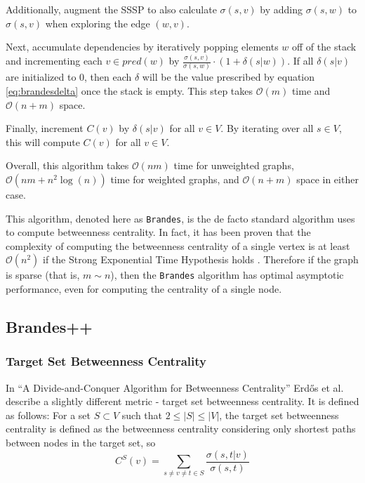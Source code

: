 \documentclass[a4paper,12pt]{article}
\begin{document}
Additionally, augment the SSSP to also calculate $\sigma(s,v)$ by adding $\sigma(s,w)$ to $\sigma(s,v)$ when exploring the edge $(w,v)$.

Next, accumulate dependencies by iteratively popping elements $w$ off of the stack and incrementing each $v \in pred(w)$ by $\frac{\sigma(s,v)}{\sigma(s,w)} \cdot (1+\delta(s|w))$. If all $\delta(s|v)$ are initialized to 0, then each $\delta$ will be the value prescribed by equation \ref{eq:brandesdelta} once the stack is empty. This step takes $\mathcal{O}(m)$ time and $\mathcal{O}(n+m)$ space.

Finally, increment $C(v)$ by $\delta(s|v)$ for all $v \in V$. By iterating over all $s \in V$, this will compute $C(v)$ for all $v \in V$.

Overall, this algorithm takes $\mathcal{O}(nm)$ time for unweighted graphs, $\mathcal{O}(nm+n^2 \log(n))$ time for weighted graphs, and $\mathcal{O}(n+m)$ space in either case.

This algorithm, denoted here as \texttt{Brandes}, is the de facto standard algorithm uses to compute betweenness centrality. In fact, it has been proven that the complexity of computing the betweenness centrality of a single vertex is at least $\mathcal{O}(n^2)$ if the Strong Exponential Time Hypothesis holds \cite{brandescomplexity}. Therefore if the graph is sparse (that is, $m \sim n$), then the \texttt{Brandes} algorithm has optimal asymptotic performance, even for computing the centrality of a single node.

\subsection{Brandes++}

\subsubsection{Target Set Betweenness Centrality} \label{sec:targetset}
In ``A Divide-and-Conquer Algorithm for Betweenness Centrality'' \cite{erdos} Erd\H{o}s et al. describe a slightly different metric - target set betweenness centrality. It is defined as follows: For a set $S \subset V$ such that $2\leq |S| \leq |V|$, the target set betweenness centrality is defined as the betweenness centrality considering only shortest paths between nodes in the target set, so
\begin{equation}\label{eq:subsetcentrality}
C^S(v) = \sum_{s \neq v \neq t \in S} \frac{\sigma(s,t|v)}{\sigma(s,t)}
\end{equation}
\end{document}
